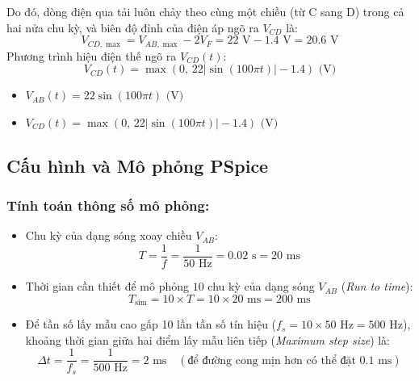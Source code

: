 \noindent Do đó, dòng điện qua tải luôn chảy theo cùng một chiều (từ C sang D) trong cả hai nửa chu kỳ, và biên độ đỉnh của điện áp ngõ ra $V_{CD}$ là:
\begin{equation}
  V_{CD,\max} = V_{AB,\max} - 2V_F = 22\text{ V} - 1.4\text{ V} = 20.6\text{ V}
\end{equation}
\noindent Phương trình hiệu điện thế ngõ ra $V_{CD}(t)$:
\begin{equation}
  V_{CD}(t) = \max\left(0,\, 22|\sin(100\pi t)| - 1.4\right)\text{ (V)}
\end{equation}

\begin{dapsobox}
  \begin{itemize}[leftmargin=1.5em]
    \item $V_{AB}(t) = 22 \sin(100\pi t)\text{ (V)}$
    \item $V_{CD}(t) = \max\left(0,\, 22|\sin(100\pi t)| - 1.4\right)\text{ (V)}$
  \end{itemize}
\end{dapsobox}

\subsection{Cấu hình và Mô phỏng PSpice}
\subsubsection*{Tính toán thông số mô phỏng:}
\begin{itemize}[leftmargin=1.5em]
  \item Chu kỳ của dạng sóng xoay chiều $V_{AB}$:
  \begin{equation}
    T = \frac{1}{f} = \frac{1}{50\text{ Hz}} = 0.02\text{ s} = 20\text{ ms}
  \end{equation}
  \item Thời gian cần thiết để mô phỏng $10$ chu kỳ của dạng sóng $V_{AB}$ (\textit{Run to time}):
  \begin{equation}
    T_{\text{sim}} = 10 \times T = 10 \times 20\text{ ms} = 200\text{ ms}
  \end{equation}
  \item Để tần số lấy mẫu cao gấp 10 lần tần số tín hiệu ($f_s = 10 \times 50\text{ Hz} = 500\text{ Hz}$), khoảng thời gian giữa hai điểm lấy mẫu liên tiếp (\textit{Maximum step size}) là:
  \begin{equation}
    \Delta t = \frac{1}{f_s} = \frac{1}{500\text{ Hz}} = 2\text{ ms} \quad (\text{để đường cong mịn hơn có thể đặt } 0.1\text{ ms})
  \end{equation}
\end{itemize}

